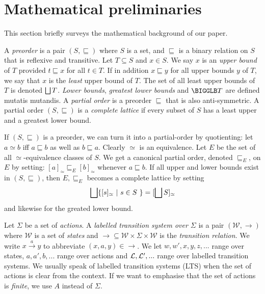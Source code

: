 \section{Mathematical preliminaries}\label{preliminaries}

\NI This section briefly surveys the mathematical background of our
paper.

A \emph{preorder} is a pair $(S, \sqsubseteq)$ where $S$ is a set, and
$\sqsubseteq$ is a binary relation on $S$ that is reflexive and
transitive. Let $T \subseteq S$ and $x \in S$. We say $x$ is an
\emph{upper bound} of $T$ provided $t \sqsubseteq x$ for all $t \in
T$. If in addition $x \sqsubseteq y$ for all upper bounds $y$ of $T$,
we say that $x$ is the \emph{least} upper bound of $T$.  The set of
all least upper bounds of $T$ is denoted $\bigsqcup T$.  \emph{Lower
  bounds}, \emph{greatest lower bounds} and $\BIGGLB T$ are defined
mutatis mutandis.  A \emph{partial order} is a preorder $\sqsubseteq$
that is also anti-symmetric.  A partial order $(S, \sqsubseteq)$ is a
\emph{complete lattice} if every subset of $S$ has a least upper and a
greatest lower bound.

If $(S, \sqsubseteq)$ is a preorder, we can turn it into a
partial-order by quotienting: let $a \simeq b$ iff $a \sqsubseteq b$
as well as $b \sqsubseteq a$. Clearly $\simeq$ is an equivalence. Let
$E$ be the set of all $\simeq$-equivalence classes of $S$. We get a
canonical partial order, denoted $\sqsubseteq_E$, on $E$ by setting:
$[a]_{\simeq} \sqsubseteq_E [b]_{\simeq}$ whenever $a \sqsubseteq
b$. If all upper and lower bounds exist in $(S, \sqsubseteq)$, then
$E, \sqsubseteq_E$ becomes a complete lattice by setting
\[
   \bigsqcup \{[s]_{\simeq} \ |\ s \in S\ \} = [\bigsqcup S]_{\simeq}
\]
and likewise for the greated lower bound.

Let $\Sigma$ be a set of \emph{actions}.  A \emph{labelled transition
  system over $\Sigma$} is a pair $(\mathcal{W}, \rightarrow)$ where
$\mathcal{W}$ is a set of \emph{states} and $\rightarrow \subseteq
\mathcal{W} \times \Sigma \times \mathcal{W}$ is the \emph{transition
  relation}.  We write $x \xrightarrow{a} y$ to abbreviate $(x,a,y)
\in \rightarrow$. We let $w, w', x, y, z, ...$ range over states, $a,
a', b, ...$ range over actions and $\mathcal{L}, \mathcal{L}', ...$ range over
labelled transition systems. We usually speak of labelled transition
systems (LTS) when the set of actions is clear from the context. If we
want to emphasise that the set of actions is \emph{finite}, we use $A$
instead of $\Sigma$.

